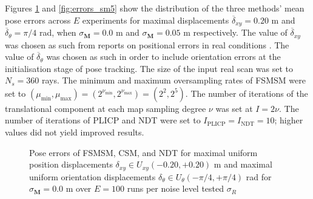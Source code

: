 Figures \ref{fig:errors_sm0} and \ref{fig:errors_sm5} show the distribution of
the three methods' mean pose errors across $E$ experiments for maximal
displacements $\overline{\delta}_{xy} = 0.20$ m and $\overline{\delta}_\theta =
\pi / 4$ rad, when $\sigma_{\bm{M}} = 0.0$ m and $\sigma_{\bm{M}} = 0.05$ m
respectively. The value of $\overline{\delta}_{xy}$ was chosen as such from
reports on positional errors in real conditions \cite{gangpeng}. The value of
$\overline{\delta}_\theta$ was chosen as such in order to include orientation
errors at the initialisation stage of pose tracking. The size of the input real
scan was set to $N_s=360$ rays. The minimum and maximum oversampling rates
of FSMSM were set to $(\mu_{\min},\mu_{\max}) = (2^{\nu_{\min}},2^{\nu_{\max}})
= (2^2,2^5)$. The number of iterations of the translational component
at each map sampling degree $\nu$ was set at $I = 2\nu$. The number of
iterations of PLICP and NDT were set to $I_{\text{PLICP}} = I_{\text{NDT}}=
10$; higher values did not yield improved results.

\begin{figure}[]\centering
  
  \caption{\small Pose errors of FSMSM, CSM, and NDT for maximal uniform
           position displacements $\delta_{xy} \in U_{xy}(-0.20, +0.20)$ m and
           maximal uniform orientation displacements
           $\delta_\theta \in U_\theta (-\pi / 4, + \pi /4)$ rad for
           $\sigma_{\bm{M}} = 0.0$ m over $E = 100$ runs per noise level tested
           $\sigma_R$}
  \label{fig:errors_sm0}
\end{figure}


